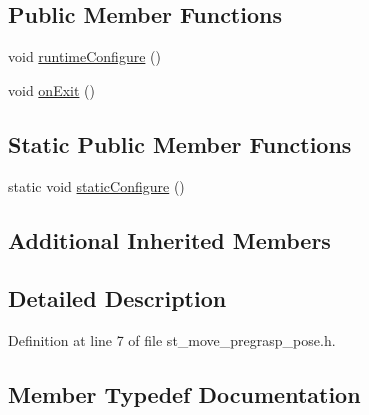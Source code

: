 \subsection*{Public Member Functions}
\begin{DoxyCompactItemize}
\item 
void \hyperlink{structsm__moveit__4_1_1pick__states_1_1StMovePregraspPose_ae9ffdf77d89169b5f4fb2cb2fadd56fc}{runtime\+Configure} ()
\item 
void \hyperlink{structsm__moveit__4_1_1pick__states_1_1StMovePregraspPose_ae2f50199e1766c1bcdb8fcd25e9a0e16}{on\+Exit} ()
\end{DoxyCompactItemize}
\subsection*{Static Public Member Functions}
\begin{DoxyCompactItemize}
\item 
static void \hyperlink{structsm__moveit__4_1_1pick__states_1_1StMovePregraspPose_afb6abd382c1c9f35dd5f74967301cc48}{static\+Configure} ()
\end{DoxyCompactItemize}
\subsection*{Additional Inherited Members}


\subsection{Detailed Description}


Definition at line 7 of file st\+\_\+move\+\_\+pregrasp\+\_\+pose.\+h.



\subsection{Member Typedef Documentation}
\mbox{\label{structsm__moveit__4_1_1pick__states_1_1StMovePregraspPose_a4329bf7123b5978a7418bda57b17541d}} 

